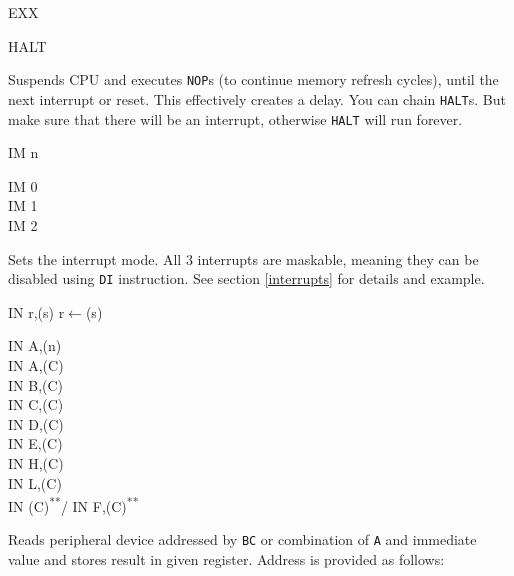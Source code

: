 \documentclass[twoside,openright,a4paper]{book}
\newcommand{\UNDOC}{\textnormal{\textsuperscript{**}}}
\begin{document}
\begin{basedescript}{
	\desclabelstyle{\multilinelabel}
	\desclabelwidth{3cm}}
\begin{detailitem}{EXX}
	\end{detailitem}

	\pagebreak
	\begin{detailitem}{HALT}
		{}

		Suspends CPU and executes {\tt NOP}s (to continue memory refresh cycles), until the next interrupt or reset. This effectively creates a delay. You can chain {\tt HALT}s. But make sure that there will be an interrupt, otherwise {\tt HALT} will run forever.

		\DetailNoEffect
						
		\begin{DetailTiming}
		\end{DetailTiming}

	\end{detailitem}

	\begin{detailitem}{IM n}
		{}

		\begin{DetailVariants}
			IM 0\\
			IM 1\\
			IM 2
		\end{DetailVariants}

		Sets the interrupt mode. All 3 interrupts are maskable, meaning they can be disabled using {\tt DI} instruction. See section \ref{interrupts} for details and example.

		\DetailNoEffect		

		\begin{DetailTiming}
			\DetailTime{}{2}{8}
		\end{DetailTiming}

	\end{detailitem}

	\begin{detailitem}{IN r,(s)}
		{r$\leftarrow$(s)}

		\begin{DetailVariants}
			IN A,(n)\\
			IN A,(C)\\
			IN B,(C)\\
			IN C,(C)\\
			IN D,(C)\\
			IN E,(C)\\
			IN H,(C)\\
			IN L,(C)\\
			IN (C)\UNDOC / IN F,(C)\UNDOC
		\end{DetailVariants}

		Reads peripheral device addressed by {\tt BC} or combination of {\tt A} and immediate value and stores result in given register. Address is provided as follows:


\end{detailitem}
\end{basedescript}
\end{document}
